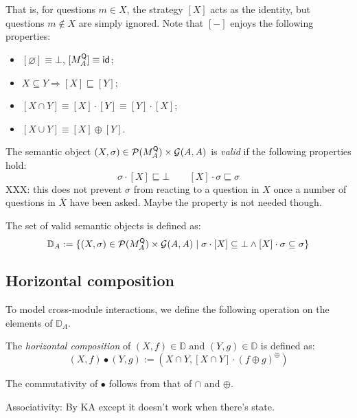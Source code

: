 That is,
for questions $m \in X$,
the strategy $[X]$ acts as the identity,
but questions $m \notin X$ are simply ignored.
Note that $[-]$ enjoys the following properties:
\begin{itemize}
\item $[\varnothing] \equiv \bot$, $[M_A^{ \mathsf{Q} }] \equiv  \mathsf{id} $;
\item $X \subseteq Y \Rightarrow [X] \sqsubseteq [Y]$;
\item $[X \cap Y] \equiv [X] \cdot [Y] \equiv [Y] \cdot [X]$;
\item $[X \cup Y] \equiv [X] \oplus [Y]$.
\end{itemize}

\begin{definition}
The semantic object
$(X, \sigma) \in \mathcal{P}(M_A^{ \mathsf{Q} }) \times \mathcal{G}(A, A)$
is \emph{valid}
if the following properties hold:
\[
  \sigma \cdot [X] \sqsubseteq \bot \qquad
  [X] \cdot \sigma \sqsubseteq \sigma
\]
XXX: this does not prevent $\sigma$
from reacting to a question in $X$
once a number of questions in $\bar{X}$ have been asked.
Maybe the property is not needed though.

The set of valid semantic objects is defined as:
\[
    \mathbb{D}_A := \{
      (X, \sigma) \in \mathcal{P}(M_A^{ \mathsf{Q} }) \times \mathcal{G}(A, A) \mid
      \sigma \cdot [X] \subseteq \bot \wedge
      [X] \cdot \sigma \subseteq \sigma
    \}
\]
\end{definition}

\subsection{Horizontal composition}

To model cross-module interactions,
we define the following operation on
the elements of $\mathbb{D}_A$.

\begin{definition}
The \emph{horizontal composition} of
$(X, f) \in \mathbb{D}$ and $(Y, g) \in \mathbb{D}$
is defined as:
\[
  (X, f) \bullet (Y, g) :=
    (X \cap Y, [X \cap Y] \cdot (f \oplus g)^\oplus)
\]
\end{definition}

The commutativity of $\bullet$ follows
from that of $\cap$ and $\oplus$.

Associativity:
By KA except it doesn't work when there's state.

